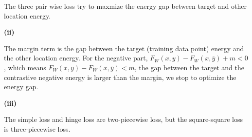The three pair wise loss try to maxmize the energy gap between target and other location energy.

\textbf{(ii)}

The margin term is the gap between the target (training data point) energy and the other location energy. For the negative part, $F_W(x, y) - F_W(x, \bar y) + m <0$, which means $F_W(x, y) - F_W(x, \bar y) <m$, the gap between the target and the contrastive negative energy is larger than the margin, we stop to optimize the energy gap.

\textbf{(iii)}

The simple loss and hinge loss are two-piecewise loss, but the square-square loss is three-piecewise loss.
